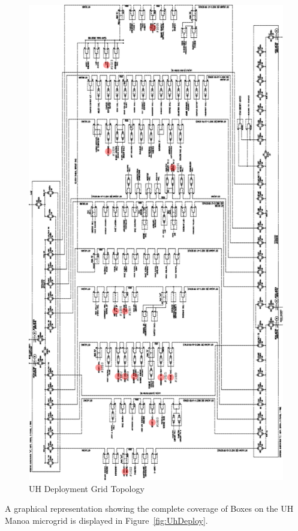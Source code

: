 \begin{figure}[H]
	\centering
	\includegraphics[height=\textheight]{figures/uh_power_grid.pdf}
	\caption{UH Deployment Grid Topology}
	\label{fig:UhGridTopo}
\end{figure}

A graphical representation showing the complete coverage of Boxes on the UH Manoa microgrid is displayed in Figure~\ref{fig:UhDeploy}.

